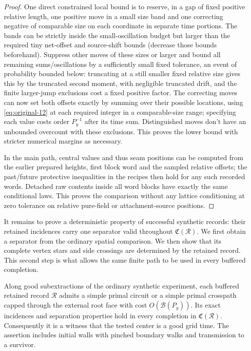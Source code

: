 \begin{proof}
One direct
constrained local bound is to reserve, in a gap of fixed positive relative length, one
positive move in a small size band and one correcting negative of comparable size on each
coordinate in separate time portions. The bands can be strictly inside the
small-oscillation budget but larger than the required tiny net-offset and source-shift
bounds (decrease those bounds beforehand). Suppress other moves of these sizes or larger
and bound all remaining sums/oscillations by a sufficiently small fixed tolerance, an
event of probability bounded below: truncating at a still smaller fixed relative size
gives this by the truncated second moment, with negligible truncated drift, and the finite
larger-jump exclusions cost a fixed positive factor. The correcting moves can now set both
offsets exactly by summing over their possible locations, using \eqref{eq:original-12} at
each required integer in a comparable-size range; specifying each value costs order
\(P_y^{-1}\) after its time sum. Distinguished moves don't have an unbounded overcount
with these exclusions. This proves the lower bound with stricter numerical margins as
necessary. 

In the main path, central values and thus seam positions can be computed from
the earlier prepared heights, first block word and the sampled relative offsets; the
past/future protective inequalities in the recipes then hold for any such recorded words.
Detached raw contents inside all word blocks have exactly the same conditional laws. This
proves the comparison without any lattice conditioning at zero tolerance on relative
pure-field or attachment-source positions.

\end{proof}

It remains to prove a deterministic property of successful synthetic
records: their retained incidences carry one separator valid throughout
$\mathfrak C(\mathcal R)$. We first obtain a separator from the ordinary
spatial comparison. We then show that its complete vertex stars and side
crossings are determined by the retained record. This second step is what
allows the same finite path to be used in every buffered completion.

\begin{lemma}\label{end:universal-certificate}
Along good subextractions of the ordinary synthetic experiment, each buffered
retained record $\mathcal R$ admits a simple primal circuit or a simple primal crosspath
capped through the external root face with cost $O(\mathcal B(P_y))$. Its exact
incidences and separation properties hold in every completion in
$\mathfrak C(\mathcal R)$. Consequently it is a
witness that the tested center is a good grid time. The assertion includes
initial walls with pinched boundary walks and transmission to a survivor.
\end{lemma}

